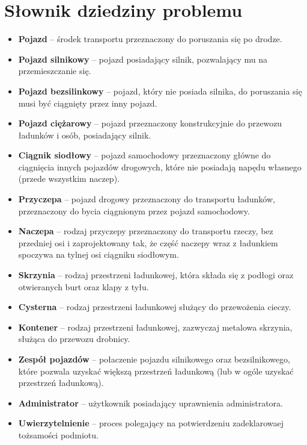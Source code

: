 \chapter{Słownik dziedziny problemu}
\begin{itemize}
    \item \textbf{Pojazd} -- środek transportu przeznaczony do poruszania się po drodze.
    \item \textbf{Pojazd silnikowy} -- pojazd posiadający silnik, pozwalający mu na przemieszczanie się.
    \item \textbf{Pojazd bezsilinkowy} -- pojazd, który nie posiada silnika, do poruszania się musi być ciągnięty przez
    inny pojazd.
    \item \textbf{Pojazd ciężarowy} -- pojazd przeznaczony konstrukcyjnie do przewozu ładunków i osób, posiadający
    silnik.
    \item \textbf{Ciągnik siodłowy} -- pojazd samochodowy przeznaczony główne do ciągnięcia innych pojazdów drogowych,
    które nie posiadają napędu własnego (przede wszystkim naczep).
    \item \textbf{Przyczepa} -- pojazd drogowy przeznaczony do transportu ładunków, przeznaczony do bycia ciągnionym
    przez pojazd samochodowy.
    \item \textbf{Naczepa} -- rodzaj przyczepy przeznaczony do transportu rzeczy, bez przedniej osi i zaprojektowany
    tak, że część naczepy wraz z ładunkiem spoczywa na tylnej osi ciągniku siodłowym.
    \item\textbf{Skrzynia} -- rodzaj przestrzeni ładunkowej, która składa się z podłogi oraz otwieranych burt oraz
    klapy z tyłu.
    \item \textbf{Cysterna} -- rodzaj przestrzeni ładunkowej służący do przewożenia cieczy.
    \item \textbf{Kontener} -- rodzaj przestrzeni ładunkowej, zazwyczaj metalowa skrzynia, służąca do przewozu drobnicy.
    \item \textbf{Zespół pojazdów} -- połaczenie pojazdu silnikowego oraz bezsilnikowego, które pozwala uzyskać
    większą przestrzeń ładunkową (lub w ogóle uzyskać przestrzeń ładunkową).
    \item \textbf{Administrator} -- użytkownik posiadający uprawnienia administratora.
    \item \textbf{Uwierzytelnienie} -- proces polegający na potwierdzeniu zadeklarowaej tożsamości podmiotu.
\end{itemize}